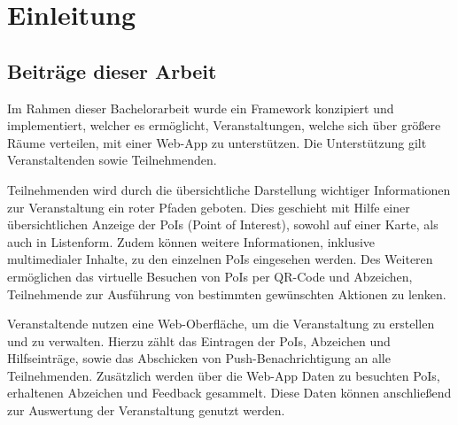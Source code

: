 \chapter{Einleitung}

%
%



\section{Beiträge dieser Arbeit}

Im Rahmen dieser Bachelorarbeit wurde ein Framework konzipiert und
implementiert, welcher es ermöglicht, Veranstaltungen, welche sich über größere
Räume verteilen, mit einer Web-App zu unterstützen. Die Unterstützung gilt
Veranstaltenden sowie Teilnehmenden.

Teilnehmenden wird durch die übersichtliche Darstellung wichtiger Informationen
zur Veranstaltung ein roter Pfaden geboten. Dies geschieht mit Hilfe einer
übersichtlichen Anzeige der PoIs (Point of Interest), sowohl auf einer Karte,
als auch in Listenform. Zudem können weitere Informationen, inklusive
multimedialer Inhalte, zu den einzelnen PoIs eingesehen werden. Des Weiteren
ermöglichen das virtuelle Besuchen von PoIs per QR-Code und Abzeichen,
Teilnehmende zur Ausführung von bestimmten gewünschten Aktionen zu lenken.

Veranstaltende nutzen eine Web-Oberfläche, um die Veranstaltung zu erstellen und
zu verwalten. Hierzu zählt das Eintragen der PoIs, Abzeichen und Hilfseinträge,
sowie das Abschicken von Push-Benachrichtigung an alle Teilnehmenden. Zusätzlich
werden über die Web-App Daten zu besuchten PoIs, erhaltenen Abzeichen und
Feedback gesammelt. Diese Daten können anschließend zur Auswertung der
Veranstaltung genutzt werden.


